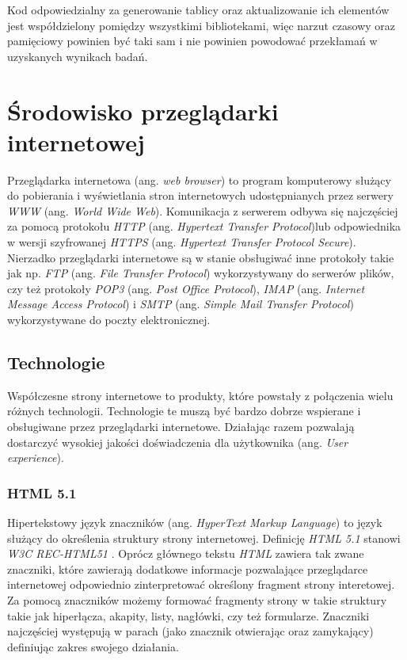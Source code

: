 \documentclass[polish, twoside, 12pt]{mwart}
\let\stdsection\section
\renewcommand*{\section}{\clearpage\stdsection}
\begin{document}
Kod odpowiedzialny za generowanie tablicy oraz aktualizowanie ich elementów jest współdzielony pomiędzy wszystkimi bibliotekami, więc narzut czasowy oraz pamięciowy powinien być taki sam i nie powinien powodować przekłamań w uzyskanych wynikach badań.

\section{Środowisko przeglądarki internetowej}

Przeglądarka internetowa (ang. \emph{web browser}) to program komputerowy służący do pobierania i wyświetlania stron internetowych udostępnianych przez serwery \emph{WWW} (ang. \emph{World Wide Web}). Komunikacja z serwerem odbywa się najczęściej za pomocą protokołu \emph{HTTP} (ang. \emph{Hypertext Transfer Protocol})lub odpowiednika w wersji szyfrowanej \emph{HTTPS} (ang. \emph{Hypertext Transfer Protocol Secure}). Nierzadko przeglądarki internetowe są w stanie obsługiwać inne protokoły takie jak np. \emph{FTP} (ang. \emph{File Transfer Protocol}) wykorzystywany do serwerów plików, czy też protokoły \emph{POP3} (ang. \emph{Post Office Protocol}), \emph{IMAP} (ang. \emph{Internet Message Access Protocol}) i \emph{SMTP} (ang. \emph{Simple Mail Transfer Protocol}) wykorzystywane do poczty elektronicznej. 

\subsection{Technologie}

Współczesne strony internetowe to produkty, które powstały z połączenia wielu różnych technologii. Technologie te muszą być bardzo dobrze wspierane i obsługiwane przez przeglądarki internetowe. Działając razem pozwalają dostarczyć wysokiej jakości doświadczenia dla użytkownika (ang. \emph{User experience}). 

\subsubsection{HTML 5.1} \label{html}

Hipertekstowy język znaczników (ang. \emph{HyperText Markup Language}) to język służący do określenia struktury strony internetowej. Definicję \emph{HTML 5.1} stanowi \emph{W3C REC-HTML51} \cite{w3c-rec-html51}. Oprócz głównego tekstu \emph{HTML} zawiera tak zwane znaczniki, które zawierają dodatkowe informacje pozwalające przeglądarce internetowej odpowiednio zinterpretować określony fragment strony interetowej. Za pomocą znaczników możemy formować fragmenty strony w takie struktury takie jak hiperłącza, akapity, listy, nagłówki, czy też formularze. Znaczniki najczęściej występują w parach (jako znacznik otwierając oraz zamykający) definiując zakres swojego działania.
\end{document}
